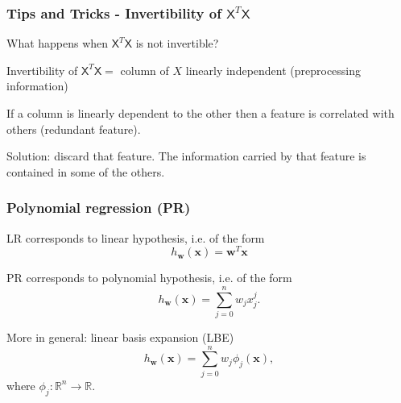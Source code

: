 \documentclass{beamer}
\begin{document}
	\begin{frame}
		\frametitle{Tips and Tricks - Invertibility of $\mathsf{X}^T\mathsf{X}$}
		What happens when $\mathsf{X}^T\mathsf{X}$ is not invertible?
		
		Invertibility of $\mathsf{X}^T\mathsf{X} =$ column of $X$ linearly independent (preprocessing information)
		
		\vspace{5mm}
		
		If a column is linearly dependent to the other then a feature is correlated with others (redundant feature).
		
		\vspace{5mm}
		
		Solution: discard that feature. The information carried by that feature is contained in some of the others. 
	\end{frame}

	\begin{frame}
		\frametitle{Polynomial regression (PR)}
		LR corresponds to linear hypothesis, i.e. of the form
		\begin{equation*}
			h_{\bm{w}}(\bm{x}) = \bm{w}^T \bm{x}
		\end{equation*}
		
		\vspace{5mm}
		
		PR corresponds to polynomial hypothesis, i.e. of the form
		\begin{equation*}
			h_{\bm{w}}(\bm{x}) = \sum_{j=0}^n w_j x^j_j.
		\end{equation*}
		
		\vspace{5mm}
		More in general: linear basis expansion (LBE)
		\begin{equation*}
			h_{\bm{w}}(\bm{x}) = \sum_{j=0}^n w_j \phi_j(\bm{x}),
		\end{equation*}
		where $\phi_j: \mathbb{R}^n \rightarrow \mathbb{R}$.
	\end{frame}
\end{document}
